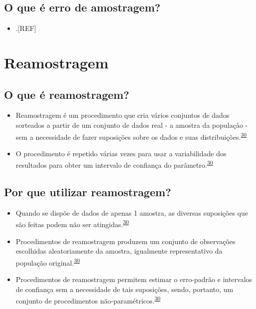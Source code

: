 \documentclass[
  a4paper,
]{book}
\providecommand{\tightlist}{%
  \setlength{\itemsep}{0pt}\setlength{\parskip}{0pt}}
\begin{document}
\hypertarget{o-que-uxe9-erro-de-amostragem}{%
\subsection{O que é erro de amostragem?}\label{o-que-uxe9-erro-de-amostragem}}

\begin{itemize}
\tightlist
\item
  .{[}REF{]}
\end{itemize}

\hypertarget{reamostragem}{%
\section{Reamostragem}\label{reamostragem}}

\hypertarget{o-que-uxe9-reamostragem}{%
\subsection{O que é reamostragem?}\label{o-que-uxe9-reamostragem}}

\begin{itemize}
\item
  Reamostragem é um procedimento que cria vários conjuntos de dados sorteados a partir de um conjunto de dados real - a amostra da população - sem a necessidade de fazer suposições sobre os dados e suas distribuições.\textsuperscript{\protect\hyperlink{ref-Bland2015}{30}}
\item
  O procedimento é repetido várias vezes para usar a variabilidade dos resultados para obter um intervalo de confiança do parâmetro.\textsuperscript{\protect\hyperlink{ref-Bland2015}{30}}
\end{itemize}

\hypertarget{por-que-utilizar-reamostragem}{%
\subsection{Por que utilizar reamostragem?}\label{por-que-utilizar-reamostragem}}

\begin{itemize}
\item
  Quando se dispõe de dados de apenas 1 amostra, as diversas suposições que são feitas podem não ser atingidas.\textsuperscript{\protect\hyperlink{ref-Bland2015}{30}}
\item
  Procedimentos de reamostragem produzem um conjunto de observações escolhidas aleatoriamente da amostra, igualmente representativo da população original.\textsuperscript{\protect\hyperlink{ref-Bland2015}{30}}
\item
  Procedimentos de reamostragem permitem estimar o erro-padrão e intervalos de confiança sem a necessidade de tais suposições, sendo, portanto, um conjunto de procedimentos não-paramétricos.\textsuperscript{\protect\hyperlink{ref-Bland2015}{30}}
\end{itemize}
\end{document}
